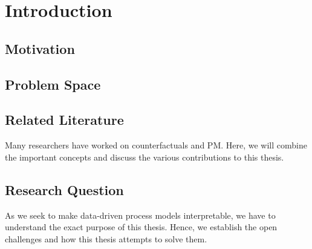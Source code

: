 \documentclass[12pt,a4paper]{report}
\begin{document}




\tableofcontents
\printglossary[type=acronym, title=List of terms, toctitle=List of terms]


\chapter{Introduction}
\label{sec:intro}

\section{Motivation}
\label{sec:motivation}


\section{Problem Space}
\label{sec:challenges}


% 

\section{Related Literature}
\label{sec:literature}
Many researchers have worked on counterfactuals and \Gls{PM}. Here, we will combine the important concepts and discuss the various contributions to this thesis.



\section{Research Question}
\label{sec:rq}
As we seek to make data-driven process models interpretable, we have to understand the exact purpose of this thesis. Hence, we establish the open challenges and how this thesis attempts to solve them. 



\end{document}
